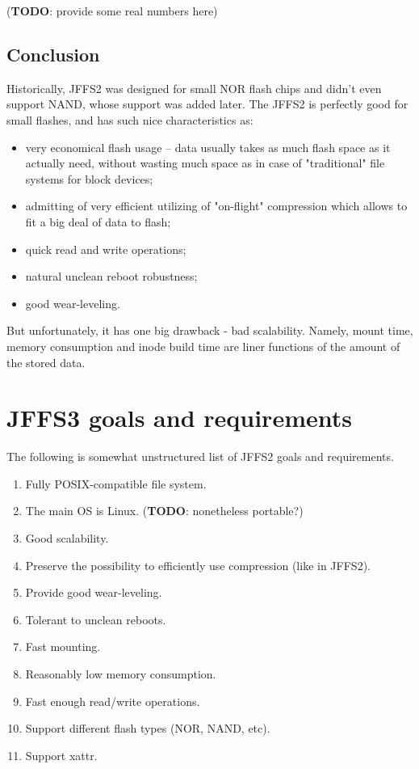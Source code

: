 \documentclass[12pt,a4paper,oneside,titlepage]{article}
\newcommand{\TODO}[1]{({\textbf{TODO}: #1})\marginpar{\large \textbf{!?!}}}
\begin{document}
\TODO{provide some real numbers here}

\subsection{Conclusion}
Historically, JFFS2 was designed for small NOR flash chips and didn't even
support NAND, whose support was added later. The JFFS2 is perfectly good for
small flashes, and has such nice characteristics as:

\begin{itemize}
\item very economical flash usage -- data usually takes as much flash
space as it actually need, without wasting much space as in case of
"traditional" file systems for block devices;
\item admitting of very efficient utilizing of "on-flight" compression which
allows to fit a big deal of data to flash;
\item quick read and write operations;
\item natural unclean reboot robustness;
\item good wear-leveling.
\end{itemize}

But unfortunately, it has one big drawback - bad scalability. Namely, mount
time, memory consumption and inode build time are liner functions of the
amount of the stored data.

%
%
\section{JFFS3 goals and requirements}
The following is somewhat unstructured list of JFFS2 goals and requirements.

\begin{enumerate}
\item Fully POSIX-compatible file system.
\item The main OS is Linux. \TODO{nonetheless portable?}
\item Good scalability.
\item Preserve the possibility to efficiently use compression (like in JFFS2).
\item Provide good wear-leveling.
\item Tolerant to unclean reboots.
\item Fast mounting.
\item Reasonably low memory consumption.
\item Fast enough read/write operations.
\item Support different flash types (NOR, NAND, etc).
\item Support xattr.
\end{enumerate}
\end{document}

